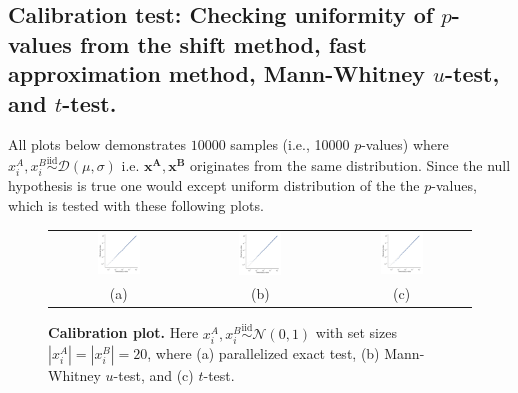 \documentclass[a4paper]{article}
\begin{document}
\subsection{Calibration test: Checking uniformity of $p$-values from the shift method, fast approximation method, Mann-Whitney $u$-test, and $t$-test.}

All plots below demonstrates $10000$ samples (i.e., 10000 $p$-values) where $x^A_i, x^B_i \stackrel{\text{iid}}{\sim}\mathcal{D}(\mu , \sigma)$ i.e. $\mathbf{x^A}, \mathbf{x^B}$ originates from the same distribution. Since the null hypothesis is true one would except uniform distribution of the the $p$-values, which is tested with these following plots.

\begin{figure}[H]
  \centering
  \begin{tabular}{ccc}
  \includegraphics[width=0.33\textwidth]{figures/calibration/large_calibration/e_norm_0_1_50.png} & \includegraphics[width=0.33\textwidth]{figures/calibration/large_calibration/mw_norm_0_1_50.png} & \includegraphics[width=0.33\textwidth]{figures/calibration/large_calibration/t_norm_0_1_50.png} \\
  (a) & (b) & (c)
  
  \end{tabular}
  \caption{{\bf Calibration plot.} Here $x^A_i, x^B_i \stackrel{\text{iid}}{\sim} \mathcal{N} (0 , 1)$ with set sizes $|x^A_i| = |x^B_i|=20$, where (a) parallelized exact test, (b) Mann-Whitney $u$-test, and (c) $t$-test.\label{fig:relerror}}
\end{figure}
\end{document}
